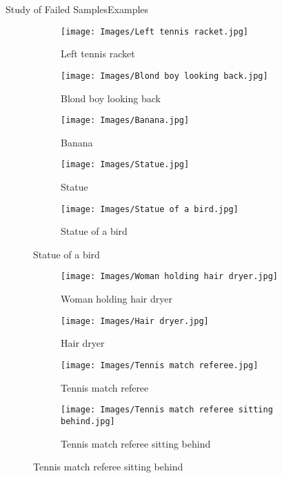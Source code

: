 \documentclass{beamer}
\begin{document}
\begin{frame}{Study of Failed Samples}{Examples}
  \vspace*{-.75cm}
  \begin{figure}
    \begin{subfigure}[t]{.32\textwidth}
      \centering
      \caption{Left tennis racket}
      \texttt{[image: Images/Left tennis racket.jpg]}
    \end{subfigure}\hfill
    \begin{subfigure}[t]{.32\textwidth}
      \centering
      \caption{Blond boy looking back}
      \texttt{[image: Images/Blond boy looking back.jpg]}
    \end{subfigure}\hfill
    \begin{subfigure}[t]{.32\textwidth}
      \centering
      \caption{Banana}
      \texttt{[image: Images/Banana.jpg]}
    \end{subfigure}

    \smallskip
    \begin{subfigure}[t]{.4\textwidth}
      \centering
      \caption{Statue}
      \texttt{[image: Images/Statue.jpg]}
    \end{subfigure}\hspace{.06\textwidth}
    \begin{subfigure}[t]{.4\textwidth}
      \centering
      \caption{Statue of a bird}
      \texttt{[image: Images/Statue of a bird.jpg]}
    \end{subfigure}
  \end{figure}
\end{frame}

\begin{frame}[plain]
  \vspace*{-.5cm}
  \begin{figure}
    \begin{subfigure}[t]{.32\textwidth}
      \centering
      \caption{Woman holding hair dryer}
      \texttt{[image: Images/Woman holding hair dryer.jpg]}
    \end{subfigure}\hspace{.1\textwidth}
    \begin{subfigure}[t]{.32\textwidth}
      \centering
      \caption{Hair dryer}
      \texttt{[image: Images/Hair dryer.jpg]}
    \end{subfigure}

    \smallskip
    \begin{subfigure}[t]{.45\textwidth}
      \centering
      \caption{Tennis match referee}
      \texttt{[image: Images/Tennis match referee.jpg]}
    \end{subfigure}\hspace{.05\textwidth}
    \begin{subfigure}[t]{.45\textwidth}
      \centering
      \caption{Tennis match referee sitting behind}
      \texttt{[image: Images/Tennis match referee sitting behind.jpg]}
    \end{subfigure}
  \end{figure}
\end{frame}
\end{document}
